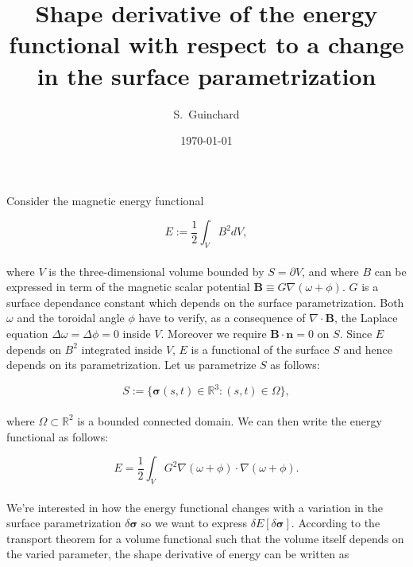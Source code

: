 \documentclass[aps,prc,floatfix,showkeys,nofootinbib]{revtex4-1}
\newcommand{\beq}{\begin{equation}}
\newcommand{\eeq}{\end{equation}}
\newcommand{\grad}{\nabla}
\begin{document}
\title{Shape derivative of the energy functional with respect to a change in the surface parametrization}

\author{S.~Guinchard} 


\date{\today}

{
\let\clearpage\relax
\maketitle
\sloppy
}

Consider the magnetic energy functional 

\beq
E := \frac{1}{2}\int_V B^2dV,\label{energy_functional}
\eeq\\

\noindent where $V$ is the three-dimensional volume bounded by $S = \partial V$, and where $B$ can be expressed in term of the magnetic scalar potential $\mathbf{B}\equiv G\grad (\omega + \phi)$. $G$ is a surface dependance constant which depends on the surface parametrization. Both $\omega$ and the toroidal angle $\phi$ have to verify, as a consequence of $\grad \cdot \mathbf{B}$, the Laplace equation $\Delta \omega = \Delta \phi = 0$ inside $V$. Moreover we require $\mathbf{B}\cdot \mathbf{n} = 0$ on $S$. Since $E$ depends on $B^2$ integrated inside $V$, $E$ is a functional of the surface $S$ and hence depends on its parametrization. Let us parametrize $S$ as follows:

\beq
S := \Big\{ \bm{\sigma}(s,t) \in \mathbb{R}^3 : (s,t) \in \Omega\Big\},
\eeq\\

\noindent where $\Omega \subset \mathbb{R}^2$ is a bounded connected domain. We can then write the energy functional as follows: 

\beq
E = \frac{1}{2}\int_VG^2\grad(\omega + \phi)\cdot\grad(\omega + \phi). 
\eeq\\

\noindent We're interested in how the energy functional changes with a variation in the surface parametrization $\delta \bm{\sigma}$ so we want to express $\delta E [\delta \bm{\sigma}]$. According to the transport theorem for a volume functional such that the volume itself depends on the varied parameter, the shape derivative of energy can be written as 
\end{document}

